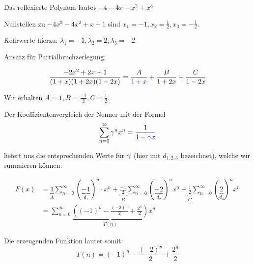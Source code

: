 \documentclass[main.tex]{subfiles}
\begin{document}
Das reflexierte Polynom lautet $-4 -4x + x^2 + x^3$

Nullstellen zu $-4x^3 -4x^2 + x + 1$ sind $x_1 = -1, x_2 = \frac{1}{2}, x_3 = -\frac{1}{2}$.

Kehrwerte hierzu: $\lambda_1 = -1, \lambda_2 = 2, \lambda_3 = -2$

Ansatz für Partialbruchzerlegung:

\begin{align*}
    \frac{
        -2x^2 + 2x +1
    }{
        (1+x)(1+2x)(1-2x)} &= \frac{A}{\textcolor{blue}{1+x}} + \frac{B}{1+2x} + \frac{C}{1-2x} \\
\end{align*}

Wir erhalten $A=1, B= \frac{-1}{2}, C=\frac{1}{2}$.

Der Koeffizientenvergleich der Nenner mit der Formel 
\begin{align*}
    \sum_{n=0}^{\infty} \textcolor{blue}{\gamma}^n x^n = \frac{1}{\textcolor{blue}{1-\gamma x}}
\end{align*}

liefert uns die entsprechenden Werte für $\textcolor{blue}{\gamma}$ (hier mit $d_{1,2,3}$ bezeichnet), welche wir summieren können.

\begin{align*}
    F(x) &= \underbrace{1}_{A} \sum_{n=0}^{\infty} (\underbrace{-1}_{d_1})^n\cdot x^n
    + \underbrace{\frac{-1}{2}}_{B} \sum_{n=0}^{\infty} (\underbrace{-2}_{d_2})^n x^n + \underbrace{\frac{1}{2}}_{C} \sum_{n=0}^{\infty} (\underbrace{2}_{d_3})^n x^n \\
    &= \sum_{n=0}^{\infty}
        \underbrace{
            \left( (-1)^n - \frac{(-2)^n}{2} + \frac{2^n}{2} \right)
        }_{T(n)} x^n
\end{align*}

Die erzeugenden Funktion lautet somit: 
\[
    T(n) = (-1)^n - \frac{(-2)^n}{2} + \frac{2^n}{2}
\]
\end{document}
